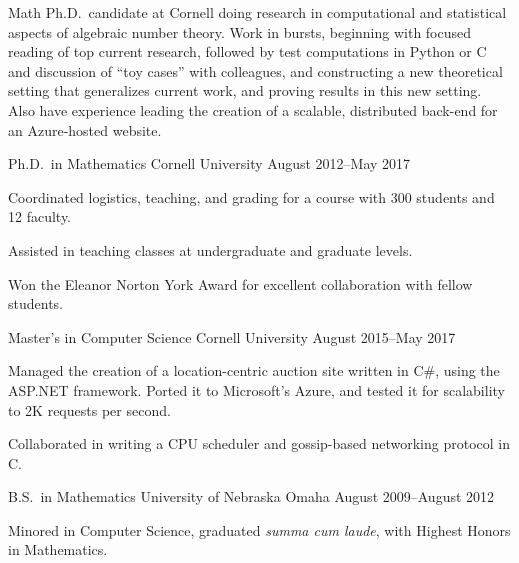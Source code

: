 \documentclass[11pt, letterpaper]{awesome-cv}
\begin{document}
\makecvheader





\begin{cvparagraph}

Math Ph.D.~candidate at Cornell doing research in computational and statistical aspects of algebraic number theory. Work in bursts, beginning with focused reading of top current research, followed by test computations in Python or C and discussion of ``toy cases'' with colleagues, and constructing a new theoretical setting that generalizes current work, and proving results in this new setting. Also have experience leading the creation of a scalable, distributed back-end for an Azure-hosted website.
\end{cvparagraph}






\begin{cventries}

\cventry
	{Ph.D.~in Mathematics}
	{Cornell University}
	{}
	{August 2012--May 2017}
	{
		\begin{cvitems}
			\item{Coordinated logistics, teaching, and grading for a course with 300 students and 12 faculty.}
			\item{Assisted in teaching classes at undergraduate and graduate levels.}
			\item{Won the Eleanor Norton York Award for excellent collaboration with fellow students.}
		\end{cvitems}
	}
	
\cventry
	{Master's in Computer Science}
	{Cornell University}
	{}
	{August 2015--May 2017}
	{
		\begin{cvitems}
			\item{Managed the creation of a location-centric auction site written in C\#, using the ASP.NET framework. Ported it to Microsoft's Azure, and tested it for scalability to 2K requests per second.}
			\item{Collaborated in writing a CPU scheduler and gossip-based networking protocol in C.}
		\end{cvitems}
	}
	
\cventry
	{B.S.~in Mathematics}
	{University of Nebraska Omaha}
	{}
	{August 2009--August 2012}
	{
		\begin{cvitems}
			\item{Minored in Computer Science, graduated \emph{summa cum laude}, with Highest Honors in Mathematics.}
		\end{cvitems}
	}
	
\end{cventries}
\end{document}
